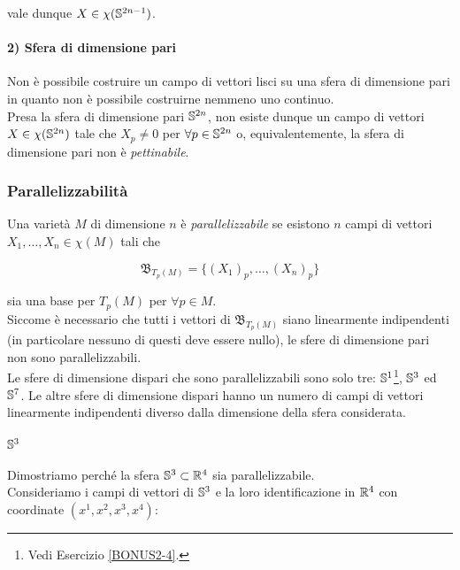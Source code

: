 vale dunque $ X \in \chi(\S^{2n-1}) $.

\paragraph{2) Sfera di dimensione pari}

Non è possibile costruire un campo di vettori lisci su una sfera di dimensione pari in quanto non è possibile costruirne nemmeno uno continuo.\\
Presa la sfera di dimensione pari $ \S^{2n} $, non esiste dunque un campo di vettori $ X \in \chi(\S^{2n}) $ tale che $ X_{p} \neq 0 $ per $ \forall p \in \S^{2n} $ o, equivalentemente, la sfera di dimensione pari non è \textit{pettinabile}.

\subsubsection{Parallelizzabilità}

Una varietà $ M $ di dimensione $ n $ è \textit{parallelizzabile} se esistono $ n $ campi di vettori $ X_{1},\dots,X_{n} \in \chi(M) $ tali che

\begin{equation}
	\mathfrak{B}_{T_{p}(M)} = \{ (X_{1})_{p},\dots,(X_{n})_{p} \}
\end{equation}

sia una base per $ T_{p}(M) $ per $ \forall p \in M $.\\
Siccome è necessario che tutti i vettori di $ \mathfrak{B}_{T_{p}(M)} $ siano linearmente indipendenti (in particolare nessuno di questi deve essere nullo), le sfere di dimensione pari non sono parallelizzabili.\\
Le sfere di dimensione dispari che sono parallelizzabili sono solo tre: $ \S^{1} $\footnote{%
	Vedi Esercizio \ref{BONUS2-4}.%
}, $ \S^{3} $ ed $ \S^{7} $. Le altre sfere di dimensione dispari hanno un numero di campi di vettori linearmente indipendenti diverso dalla dimensione della sfera considerata.

\paragraph{$ \S^{3} $}

Dimostriamo perché la sfera $ \S^{3} \subset \R^{4} $ sia parallelizzabile.\\
Consideriamo i campi di vettori di $ \S^{3} $ e la loro identificazione in $ \R^{4} $ con coordinate $ (x^{1},x^{2},x^{3},x^{4}) $:

